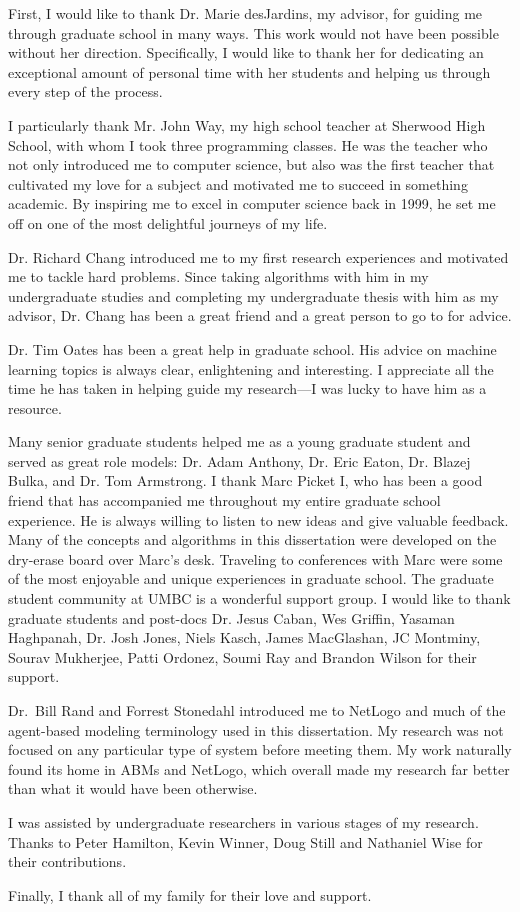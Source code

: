 \pagestyle{plain}

First, I would like to thank Dr. Marie desJardins, my advisor, for guiding me through graduate school in many ways.
This work would not have been possible without her direction.
Specifically, I would like to thank her for dedicating an exceptional amount of personal time with her students and helping us through every step of the process.

I particularly thank Mr. John Way, my high school teacher at Sherwood High School, with whom I took three programming classes.
He was the teacher who not only introduced me to computer science, but also was the first teacher that cultivated my love for a subject and motivated me to succeed in something academic.
By inspiring me to excel in computer science back in 1999, he set me off on one of the most delightful journeys of my life.

Dr. Richard Chang introduced me to my first research experiences and motivated me to tackle hard problems.
Since taking algorithms with him in my undergraduate studies and completing my undergraduate thesis with him as my advisor, Dr. Chang has been a great friend and a great person to go to for advice.

Dr. Tim Oates has been a great help in graduate school.
His advice on machine learning topics is always clear, enlightening and interesting.
I appreciate all the time he has taken in helping guide my research---I was lucky to have him as a resource.

Many senior graduate students helped me as a young graduate student and served as great role models: Dr. Adam Anthony, Dr. Eric Eaton,  Dr. Blazej Bulka, and Dr. Tom Armstrong.
I thank Marc Picket I, who has been a good friend that has accompanied me throughout my entire graduate school experience.
He is always willing to listen to new ideas and give valuable feedback.
Many of the concepts and algorithms in this dissertation were developed on the dry-erase board over Marc's desk.
Traveling to conferences with Marc were some of the most enjoyable and unique experiences in graduate school.
The graduate student community at UMBC is a wonderful support group.
I would like to thank graduate students and post-docs Dr. Jesus Caban, Wes Griffin, Yasaman Haghpanah, Dr. Josh Jones, Niels Kasch, James MacGlashan, JC Montminy, Sourav Mukherjee, Patti Ordonez, Soumi Ray and Brandon Wilson for their support.

Dr.~{}Bill Rand and Forrest Stonedahl introduced me to NetLogo and much of the agent-based modeling terminology used in this dissertation.
My research was not focused on any particular type of system before meeting them.
My work naturally found its home in ABMs and NetLogo, which overall made my research far better than what it would have been otherwise.

I was assisted by undergraduate researchers in various stages of my research.
Thanks to Peter Hamilton, Kevin Winner, Doug Still and Nathaniel Wise for their contributions.

Finally, I thank all of my family for their love and support.


